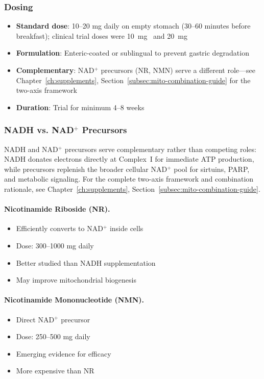\subsubsection{Dosing}

\begin{itemize}
    \item \textbf{Standard dose}: 10--20 mg daily on empty stomach (30--60 minutes before breakfast); clinical trial doses were 10~mg~\cite{Forsyth1999NADH} and 20~mg~\cite{CastroMarrero2021fatigue}
    \item \textbf{Formulation}: Enteric-coated or sublingual to prevent gastric degradation
    \item \textbf{Complementary}: NAD$^+$ precursors (NR, NMN) serve a different role---see Chapter~\ref{ch:supplements}, Section~\ref{subsec:mito-combination-guide} for the two-axis framework
    \item \textbf{Duration}: Trial for minimum 4--8 weeks
\end{itemize}

\subsubsection{NADH vs. NAD$^+$ Precursors}

NADH and NAD$^+$ precursors serve complementary rather than competing roles: NADH donates electrons directly at Complex~I for immediate ATP production, while precursors replenish the broader cellular NAD$^+$ pool for sirtuins, PARP, and metabolic signaling. For the complete two-axis framework and combination rationale, see Chapter~\ref{ch:supplements}, Section~\ref{subsec:mito-combination-guide}.

\paragraph{Nicotinamide Riboside (NR).}
\begin{itemize}
    \item Efficiently converts to NAD$^+$ inside cells
    \item Dose: 300--1000 mg daily
    \item Better studied than NADH supplementation
    \item May improve mitochondrial biogenesis
\end{itemize}

\paragraph{Nicotinamide Mononucleotide (NMN).}
\begin{itemize}
    \item Direct NAD$^+$ precursor
    \item Dose: 250--500 mg daily
    \item Emerging evidence for efficacy
    \item More expensive than NR
\end{itemize}

